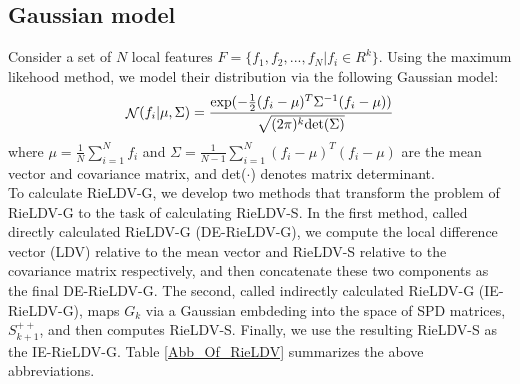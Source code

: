 \documentclass[review]{elsarticle}
\begin{document}
\subsection{Gaussian model}
	\indent Consider a set of $N$ local features $F = \{ f_1,f_2,...,f_N | f_i \in R^k \}$. Using the maximum likehood method, we model their distribution via the following Gaussian model\cite{wang2016raid,wang2016towards}:
\begin{equation}
\label{eq5}
\begin{split}
\mathop \mathcal{N}(f_i|\mu,\Sigma) = \frac{{\rm exp}(-\frac{1}{2}(f_i - \mu)^T \Sigma^{-1} (f_i - \mu))}{\sqrt{(2\pi)^k{\rm det}(\Sigma)}}
\end{split}
\end{equation} 
where $\mu = \frac{1}{N}{\sum_{i=1}^N}{f_i}$ and $\Sigma = \frac{1}{N-1}{\sum_{i=1}^N}(f_i - \mu)^T(f_i - \mu)$ are the mean vector and covariance matrix, and det($\cdot$) denotes matrix determinant.\\
	\indent To calculate RieLDV-G, we develop two methods that transform the problem of RieLDV-G to the task of calculating RieLDV-S. In the first method, called directly calculated RieLDV-G (DE-RieLDV-G), we compute the local difference vector (LDV) relative to the  mean vector and RieLDV-S relative to the covariance matrix respectively, and then concatenate these two components as the final DE-RieLDV-G. The second, called indirectly calculated RieLDV-G (IE-RieLDV-G), maps $G_k$ via a Gaussian embdeding \cite{wang2016towards} into the space of SPD matrices, $S_{k+1}^{++}$, and then computes RieLDV-S. Finally, we use the resulting RieLDV-S as the IE-RieLDV-G. Table \ref{Abb_Of_RieLDV} summarizes the above abbreviations.
\begin{table}
\renewcommand\arraystretch{1.15}
\centering
\caption{\label{tab:overlapping}The Abbreviations of different types of Riemannian local difference vectors.}
\vspace {1.5mm}
\label{Abb_Of_RieLDV}
\normalsize 
{}
\end{table}
\end{document}
